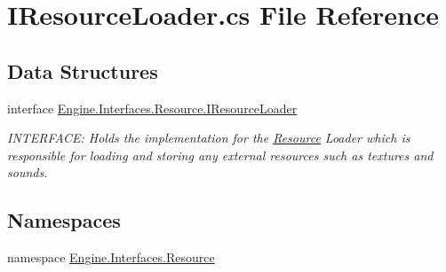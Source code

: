\hypertarget{a00128}{}\section{I\+Resource\+Loader.\+cs File Reference}
\label{a00128}
\subsection*{Data Structures}
\begin{DoxyCompactItemize}
\item 
interface \hyperlink{a00462}{Engine.\+Interfaces.\+Resource.\+I\+Resource\+Loader}
\begin{DoxyCompactList}\small\item\em I\+N\+T\+E\+R\+F\+A\+CE\+: Holds the implementation for the \hyperlink{a00262}{Resource} Loader which is responsible for loading and storing any external resources such as textures and sounds. \end{DoxyCompactList}\end{DoxyCompactItemize}
\subsection*{Namespaces}
\begin{DoxyCompactItemize}
\item 
namespace \hyperlink{a00262}{Engine.\+Interfaces.\+Resource}
\end{DoxyCompactItemize}
